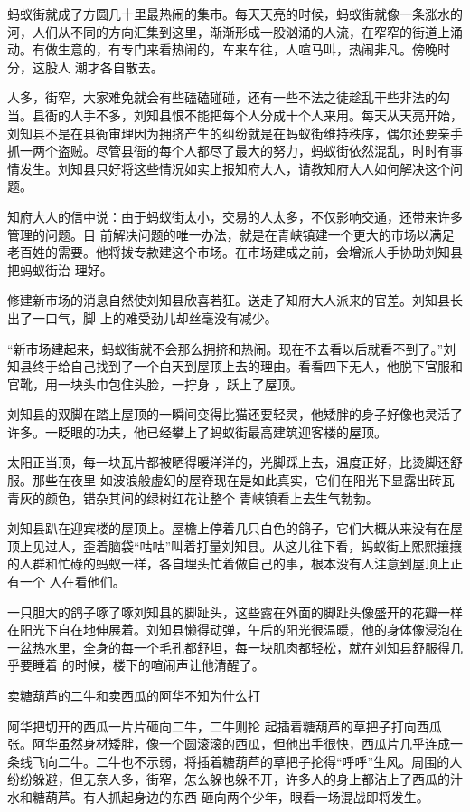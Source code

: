 \documentclass{article}
\begin{document}
蚂蚁街就成了方圆几十里最热闹的集市。每天天亮的时候，蚂蚁街就像一条涨水的河，人们从不同的方向汇集到这里，渐渐形成一股汹涌的人流，在窄窄的街道上涌动。有做生意的，有专门来看热闹的，车来车往，人喧马叫，热闹非凡。傍晚时分，这股人
潮才各自散去。 

人多，街窄，大家难免就会有些磕磕碰碰，还有一些不法之徒趁乱干些非法的勾当。县衙的人手不多，刘知县恨不能把每个人分成十个人来用。每天从天亮开始，刘知县不是在县衙审理因为拥挤产生的纠纷就是在蚂蚁街维持秩序，偶尔还要亲手抓一两个盗贼。尽管县衙的每个人都尽了最大的努力，蚂蚁街依然混乱，时时有事情发生。刘知县只好将这些情况如实上报知府大人，请教知府大人如何解决这个问题。

知府大人的信中说：由于蚂蚁街太小，交易的人太多，不仅影响交通，还带来许多管理的问题。目
\newpage
前解决问题的唯一办法，就是在青峡镇建一个更大的市场以满足老百姓的需要。他将拨专款建这个市场。在市场建成之前，会增派人手协助刘知县把蚂蚁街治
理好。 

修建新市场的消息自然使刘知县欣喜若狂。送走了知府大人派来的官差。刘知县长出了一口气，脚
上的难受劲儿却丝毫没有减少。 

“新市场建起来，蚂蚁街就不会那么拥挤和热闹。现在不去看以后就看不到了。”刘知县终于给自己找到了一个白天到屋顶上去的理由。看看四下无人，他脱下官服和官靴，用一块头巾包住头脸，一拧身
，跃上了屋顶。 

刘知县的双脚在踏上屋顶的一瞬间变得比猫还要轻灵，他矮胖的身子好像也灵活了许多。一眨眼的功夫，他已经攀上了蚂蚁街最高建筑迎客楼的屋顶。

太阳正当顶，每一块瓦片都被晒得暖洋洋的，光脚踩上去，温度正好，比烫脚还舒服。那些在夜里
\newpage
如波浪般虚幻的屋脊现在是如此真实，它们在阳光下显露出砖瓦青灰的颜色，错杂其间的绿树红花让整个
青峡镇看上去生气勃勃。 

刘知县趴在迎宾楼的屋顶上。屋檐上停着几只白色的鸽子，它们大概从来没有在屋顶上见过人，歪着脑袋“咕咕”叫着打量刘知县。从这儿往下看，蚂蚁街上熙熙攘攘的人群和忙碌的蚂蚁一样，各自埋头忙着做自己的事，根本没有人注意到屋顶上正有一个
人在看他们。 

一只胆大的鸽子啄了啄刘知县的脚趾头，这些露在外面的脚趾头像盛开的花瓣一样在阳光下自在地伸展着。刘知县懒得动弹，午后的阳光很温暖，他的身体像浸泡在一盆热水里，全身的每一个毛孔都舒坦，每一块肌肉都轻松，就在刘知县舒服得几乎要睡着
的时候，楼下的喧闹声让他清醒了。 

卖糖葫芦的二牛和卖西瓜的阿华不知为什么打

阿华把切开的西瓜一片片砸向二牛，二牛则抡
\newpage
起插着糖葫芦的草把子打向西瓜张。阿华虽然身材矮胖，像一个圆滚滚的西瓜，但他出手很快，西瓜片几乎连成一条线飞向二牛。二牛也不示弱，将插着糖葫芦的草把子抡得“呼呼”生风。周围的人纷纷躲避，但无奈人多，街窄，怎么躲也躲不开，许多人的身上都沾上了西瓜的汁水和糖葫芦。有人抓起身边的东西
砸向两个少年，眼看一场混战即将发生。 
\end{document}
